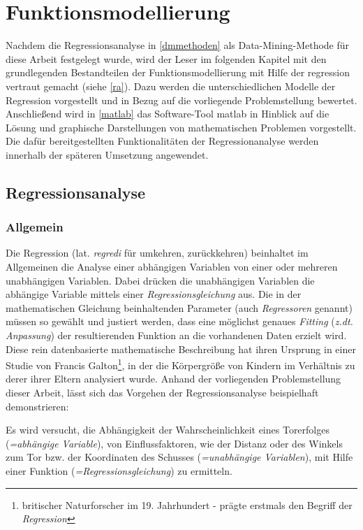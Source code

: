 \section{Funktionsmodellierung}
\label{fm}
Nachdem die Regressionsanalyse in \vref{dmmethoden} als Data-Mining-Methode für diese Arbeit festgelegt wurde, wird der Leser im folgenden Kapitel mit den grundlegenden Bestandteilen der Funktionsmodellierung mit Hilfe der \gls{regression} vertraut gemacht (siehe \vref{ra}). Dazu werden die unterschiedlichen Modelle der Regression vorgestellt und in Bezug auf die vorliegende Problemstellung bewertet. Anschließend wird in \vref{matlab} das Software-Tool \gls{matlab} in Hinblick auf die Lösung und graphische Darstellungen von mathematischen Problemen vorgestellt. Die dafür bereitgestellten Funktionalitäten der Regressionanalyse werden innerhalb der späteren Umsetzung angewendet.


\subsection{Regressionsanalyse}
\label{ra}
\subsubsection{Allgemein}
Die Regression (lat. \textit{regredi} für umkehren, zurückkehren) beinhaltet im Allgemeinen die Analyse einer abhängigen Variablen von einer oder mehreren unabhängigen Variablen. Dabei drücken die unabhängigen Variablen die abhängige Variable mittels einer \textit{Regressionsgleichung} aus. Die in der mathematischen Gleichung beinhaltenden Parameter (auch \textit{Regressoren} genannt) müssen so gewählt und justiert werden, dass eine möglichst genaues \textit{Fitting} (\textit{z.dt. Anpassung}) der resultierenden Funktion an die vorhandenen Daten erzielt wird. Diese rein datenbasierte mathematische Beschreibung hat ihren Ursprung in einer Studie von Francis Galton\footnote{britischer Naturforscher im 19. Jahrhundert - prägte erstmals den Begriff der \textit{Regression}}, in der die Körpergröße von Kindern im Verhältnis zu derer ihrer Eltern analysiert wurde. Anhand der vorliegenden Problemstellung dieser Arbeit, lässt sich das Vorgehen der Regressionsanalyse beispielhaft demonstrieren:

Es wird versucht, die Abhängigkeit der Wahrscheinlichkeit eines Torerfolges (\textit{=abhängige Variable}), von Einflussfaktoren, wie der Distanz oder des Winkels zum Tor bzw. der Koordinaten des Schusses (\textit{=unabhängige Variablen}), mit Hilfe einer Funktion (\textit{=Regressionsgleichung}) zu ermitteln. 

